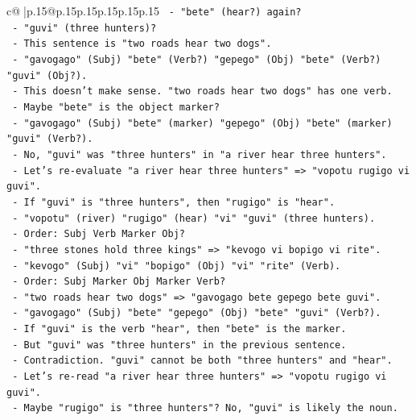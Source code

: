 \documentclass{article}
\begin{document}
{\begin{supertabular}{c@{$\;$}|p{.15\linewidth}@{}p{.15\linewidth}p{.15\linewidth}p{.15\linewidth}p{.15\linewidth}p{.15\linewidth}}
{{{\texttt{        {-} "bete" (hear?) again?} \\
\texttt{        {-} "guvi" (three hunters)?} \\
\texttt{        {-} This sentence is "two roads hear two dogs".} \\
\texttt{        {-} "gavogago" (Subj) "bete" (Verb?) "gepego" (Obj) "bete" (Verb?) "guvi" (Obj?).} \\
\texttt{        {-} This doesn't make sense. "two roads hear two dogs" has one verb.} \\
\texttt{        {-} Maybe "bete" is the object marker?} \\
\texttt{        {-} "gavogago" (Subj) "bete" (marker) "gepego" (Obj) "bete" (marker) "guvi" (Verb?).} \\
\texttt{        {-} No, "guvi" was "three hunters" in "a river hear three hunters".} \\
\texttt{        {-} Let's re{-}evaluate "a river hear three hunters" => "vopotu rugigo vi guvi".} \\
\texttt{          {-} If "guvi" is "three hunters", then "rugigo" is "hear".} \\
\texttt{          {-} "vopotu" (river) "rugigo" (hear) "vi" "guvi" (three hunters).} \\
\texttt{          {-} Order: Subj Verb Marker Obj?} \\
\texttt{        {-} "three stones hold three kings" => "kevogo vi bopigo vi rite".} \\
\texttt{          {-} "kevogo" (Subj) "vi" "bopigo" (Obj) "vi" "rite" (Verb).} \\
\texttt{          {-} Order: Subj Marker Obj Marker Verb?} \\
\texttt{        {-} "two roads hear two dogs" => "gavogago bete gepego bete guvi".} \\
\texttt{          {-} "gavogago" (Subj) "bete" "gepego" (Obj) "bete" "guvi" (Verb?).} \\
\texttt{          {-} If "guvi" is the verb "hear", then "bete" is the marker.} \\
\texttt{          {-} But "guvi" was "three hunters" in the previous sentence.} \\
\texttt{          {-} Contradiction. "guvi" cannot be both "three hunters" and "hear".} \\
\texttt{          {-} Let's re{-}read "a river hear three hunters" => "vopotu rugigo vi guvi".} \\
\texttt{            {-} Maybe "rugigo" is "three hunters"? No, "guvi" is likely the noun.} \\
}}}
\end{supertabular}}
\end{document}
